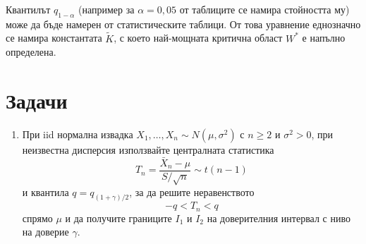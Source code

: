 \begin{example}
\begin{lecfigure}
\end{lecfigure}

Квантилът $q_{1-\alpha}$ (например за $\alpha = 0{,}05$ от таблиците се намира стойността му) може да бъде намерен от статистическите таблици. От това уравнение еднозначно се намира константата $\tilde{K}$, с което най-мощната критична област $W^*$ е напълно определена.

\end{example}

\section{Задачи}

\begin{enumerate}
    \item При iid нормална извадка $X_1,\dots,X_n\sim N(\mu,\sigma^2)$ с $n\ge2$ и
    $\sigma^2>0$, при неизвестна дисперсия използвайте централната статистика
    \[
    T_n=\frac{\bar X_n-\mu}{S/\sqrt n}\sim t(n-1)
    \]
    и квантила $q=q_{(1+\gamma)/2}$, за да решите неравенството
    \[
    -q<T_n<q
    \]
    спрямо $\mu$ и да получите границите $I_1$ и $I_2$ на доверителния интервал с ниво на доверие $\gamma$.
\end{enumerate}
